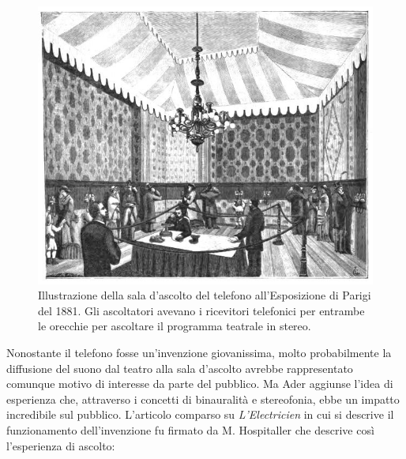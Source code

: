\begin{figure}[t]
\centering
\includegraphics[width=1\columnwidth]{CAPITOLI/1000/IMG/1881opr4.jpg}
\caption{Illustrazione della sala d'ascolto del telefono all'Esposizione di
Parigi del 1881. Gli ascoltatori avevano i ricevitori telefonici per entrambe
le orecchie per ascoltare il programma teatrale in stereo.}
\label{fig:teatrophone2}
\end{figure}

Nonostante il telefono fosse un'invenzione giovanissima, molto probabilmente
la diffusione del suono dal teatro alla sala d'ascolto avrebbe rappresentato
comunque motivo di interesse da parte del pubblico. Ma Ader aggiunse l'idea
di esperienza che, attraverso i concetti di binauralità e stereofonia, ebbe un
impatto incredibile sul pubblico. L'articolo comparso su \emph{L'Electricien}
in cui si descrive il funzionamento dell'invenzione fu firmato da M. Hospitaller che
descrive così l'esperienza di ascolto:

